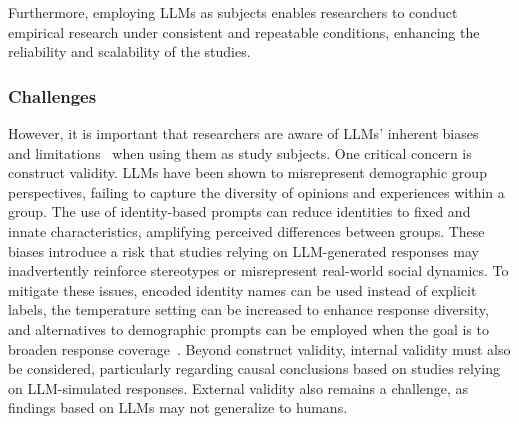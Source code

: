 
Furthermore, employing LLMs as subjects enables researchers to conduct empirical research under consistent and repeatable conditions, enhancing the reliability and scalability of the studies.

\subsubsection{Challenges}

However, it is important that researchers are aware of LLMs' inherent biases~\cite{Crowell2023} and limitations~\cite{DBLP:journals/ais/HardingDLL24, DBLP:journals/corr/abs-2402-01908} when using them as study subjects. 
One critical concern is construct validity. LLMs have been shown to misrepresent demographic group perspectives, %
failing to capture the diversity of opinions and experiences within a group.
The use of identity-based prompts can reduce identities to fixed and innate characteristics, amplifying perceived differences between groups.
These biases introduce a risk that studies relying on LLM-generated responses may inadvertently reinforce stereotypes or misrepresent real-world social dynamics. To mitigate these issues, encoded identity names can be used instead of explicit labels, the temperature setting can be increased to enhance response diversity, and alternatives to demographic prompts can be employed when the goal is to broaden response coverage~\cite{DBLP:journals/ais/HardingDLL24, DBLP:journals/corr/abs-2402-01908}.
Beyond construct validity, internal validity must also be considered, particularly regarding causal conclusions based on studies relying on LLM-simulated responses.
External validity also remains a challenge, as findings based on LLMs may not generalize to humans.

